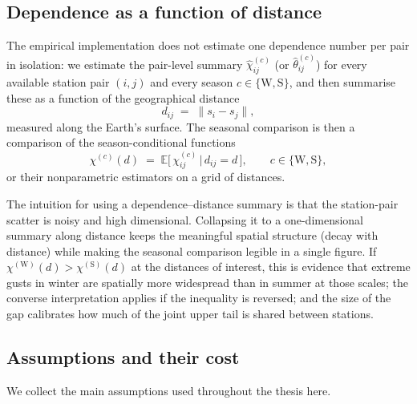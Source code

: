 \subsection{Dependence as a function of distance}
\label{sec:evt-dependence-distance}

The empirical implementation does not estimate one dependence
number per pair in isolation: we estimate the pair-level summary
\(\widehat{\chi}_{ij}^{(c)}\) (or \(\widehat{\theta}_{ij}^{(c)}\))
for every available station pair \((i,j)\) and every season
\(c \in \{\mathrm{W},\mathrm{S}\}\), and then summarise these as a
function of the geographical distance
\[
    d_{ij} \;=\; \lVert s_i - s_j \rVert,
\]
measured along the Earth's surface. The seasonal comparison is then
a comparison of the season-conditional functions
\[
    \chi^{(c)}(d) \;=\; \mathbb{E}\!\bigl[\,
    \chi_{ij}^{(c)} \,\big|\, d_{ij} = d \,\bigr],
    \qquad c \in \{\mathrm{W},\mathrm{S}\},
\]
or their nonparametric estimators on a grid of distances.

The intuition for using a dependence--distance summary is that the
station-pair scatter is noisy and high dimensional. Collapsing it
to a one-dimensional summary along distance keeps the meaningful
spatial structure (decay with distance) while making the seasonal
comparison legible in a single figure. If
\(\chi^{(\mathrm{W})}(d) > \chi^{(\mathrm{S})}(d)\) at the
distances of interest, this is evidence that extreme gusts in
winter are spatially more widespread than in summer at those
scales; the converse interpretation applies if the inequality is
reversed; and the size of the gap calibrates how much of the joint
upper tail is shared between stations.

\subsection{Assumptions and their cost}\label{sec:evt-assumptions}

We collect the main assumptions used throughout the thesis here.

